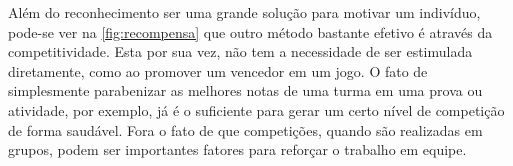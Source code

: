 Além do reconhecimento ser uma grande solução para motivar um indivíduo, pode-se ver na \autoref{fig:recompensa} que outro método bastante efetivo é através da competitividade. Esta por sua vez, não tem a necessidade de ser estimulada diretamente, como ao promover um vencedor em um jogo. O fato de simplesmente parabenizar as melhores notas de uma turma em uma prova ou atividade, por exemplo, já é o suficiente para gerar um certo nível de competição de forma saudável. Fora o fato de que competições, quando são realizadas em grupos, podem ser importantes fatores para reforçar o trabalho em equipe.

\FloatBarrier


